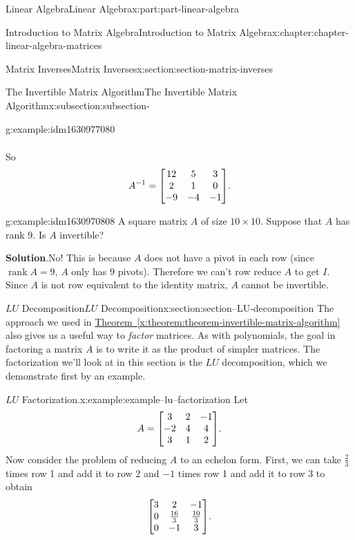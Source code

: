 \documentclass[twoside,10pt,]{book}
\newcommand{\blocktitlefont}{\relax}
\newcommand{\xreffont}{\relax}
\numberwithin{equation}{part}
\providecommand{\rank}[1]{\operatorname{rank}{#1}}
\begin{document}
\begin{partptx}{Linear Algebra}{}{Linear Algebra}{}{}{x:part:part-linear-algebra}
\begin{chapterptx}{Introduction to Matrix Algebra}{}{Introduction to Matrix Algebra}{}{}{x:chapter:chapter-linear-algebra-matrices}
\begin{sectionptx}{Matrix Inverses}{}{Matrix Inverses}{}{}{x:section:section-matrix-inverses}
\begin{subsectionptx}{The Invertible Matrix Algorithm}{}{The Invertible Matrix Algorithm}{}{}{x:subsection:subsection-}
\begin{example}{}{g:example:idm1630977080}
\begin{align*}
\end{align*}
%
\par
So%
\begin{equation*}
A^{-1} = \mqty[12 & 5 & 3 \\ 2 & 1 & 0 \\ -9 & -4 & -1].
\end{equation*}
%
\end{example}
\begin{example}{}{g:example:idm1630970808}%
A square matrix \(A\) of size \(10\times10\). Suppose that \(A\) has rank \(9\). Is \(A\) invertible?%
\par\smallskip%
\noindent\textbf{\blocktitlefont Solution}.\hypertarget{g:solution:idm1630972600}{}\quad{}No! This is because \(A\) does not have a pivot in each row (since \(\rank A = 9\), \(A\) only has \(9\) pivots). Therefore we can't row reduce \(A\) to get \(I\). Since \(A\) is not row equivalent to the identity matrix, \(A\) cannot be invertible.%
\end{example}
\end{subsectionptx}
\end{sectionptx}
%
%
\typeout{************************************************}
\typeout{************************************************}
%
\begin{sectionptx}{\(LU\) Decomposition}{}{\(LU\) Decomposition}{}{}{x:section:section--LU-decomposition}
The approach we used in \hyperref[x:theorem:theorem-invertible-matrix-algorithm]{Theorem~{\xreffont\ref{x:theorem:theorem-invertible-matrix-algorithm}}} also gives us a useful way to \emph{factor} matrices. As with polynomials, the goal in factoring a matrix \(A\) is to write it as the product of simpler matrices. The factorization we'll look at in this section is the \(LU\) decomposition, which we demonstrate first by an example.%
\begin{example}{\(LU\) Factorization.}{x:example:example--lu--factorization}%
Let%
\begin{equation*}
A = \mqty[3 & 2 & -1 \\ -2 & 4 & 4 \\ 3 & 1 & 2]\text{.}
\end{equation*}
Now consider the problem of reducing \(A\) to an echelon form. First, we can take \(\frac{2}{3}\) times row 1 and add it to row 2 and \(-1\) times row 1 and add it to row 3 to obtain%
\begin{equation*}
\mqty[3 & 2 & -1 \\ 0 & \frac{16}{3} & \frac{10}{3} \\ 0 & -1 & 3].

\end{equation*}
\end{example}
\end{sectionptx}
\end{chapterptx}
\end{partptx}
\end{document}
